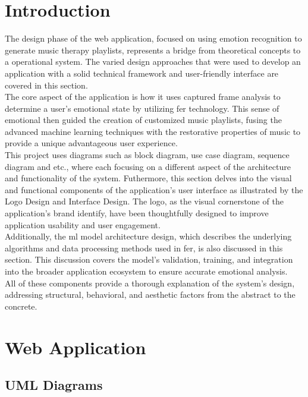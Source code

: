 \section{Introduction}
The design phase of the web application, focused on using emotion recognition to generate music therapy playlists, represents a bridge from theoretical concepts to a operational system.
The varied design approaches that were used to develop an application with a solid technical framework and user-friendly interface are covered in this section.
\\
\indent The core aspect of the application is how it uses captured frame analysis to determine a user's emotional state by utilizing \gls{fer} technology.
This sense of emotional then guided the creation of customized music playlists, fusing the advanced machine learning techniques with the restorative properties of music to provide a unique advantageous user experience.
\\
\indent This project uses diagrams such as block diagram, use case diagram, sequence diagram and etc., where each focusing on a different aspect of the architecture and functionality of the system.
Futhermore, this section delves into the visual and functional components of the application's user interface as illustrated by the Logo Design and Interface Design.
The logo, as the visual cornerstone of the application's brand identify, have been thoughtfully designed to improve application usability and user engagement.
\\
\indent Additionally, the \gls{ml} model architecture design, which describes the underlying algorithms and data processing methods used in \gls{fer}, is also discussed in this section.
This discussion covers the model's validation, training, and integration into the broader application ecosystem to ensure accurate emotional analysis.
\\
\indent All of these components provide a thorough explanation of the system's design, addressing structural, behavioral, and aesthetic factors from the abstract to the concrete.

\section{Web Application}
\subsection{UML Diagrams}
